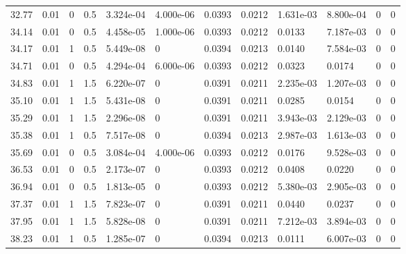 \documentclass[preview]{standalone}
\begin{document}
{{{\begin{tabular}{L{1.2cm}C{1.2cm} C{0.3cm}C{0.5cm} C{1.4cm}C{1.4cm} C{1.4cm}C{1.4cm} C{1.6cm}C{1.6cm} C{1.6cm}C{1.6cm}}
  32.77  &  0.01  & 0     & 0.5 &  3.324e-04  & 4.000e-06  &  0.0393&   0.0212& 1.631e-03 & 8.800e-04   &  0 & 0  \\ 
  34.14  &  0.01  & 0     & 0.5 &  4.458e-05  & 1.000e-06  &  0.0393&   0.0212& 0.0133 & 7.187e-03   &  0 & 0  \\ 
  34.17  &  0.01  & 1     & 0.5 &  5.449e-08  & 0  &  0.0394&   0.0213& 0.0140 & 7.584e-03   &  0 & 0  \\ 
  34.71  &  0.01  & 0     & 0.5 &  4.294e-04  & 6.000e-06  &  0.0393&   0.0212& 0.0323 & 0.0174   &  0 & 0  \\ 
  34.83  &  0.01  & 1     & 1.5 &  6.220e-07  & 0  &  0.0391&   0.0211& 2.235e-03 & 1.207e-03   &  0 & 0  \\ 
  35.10  &  0.01  & 1     & 1.5 &  5.431e-08  & 0  &  0.0391&   0.0211& 0.0285 & 0.0154   &  0 & 0  \\ 
  35.29  &  0.01  & 1     & 1.5 &  2.296e-08  & 0  &  0.0391&   0.0211& 3.943e-03 & 2.129e-03   &  0 & 0  \\ 
  35.38  &  0.01  & 1     & 0.5 &  7.517e-08  & 0  &  0.0394&   0.0213& 2.987e-03 & 1.613e-03   &  0 & 0  \\ 
  35.69  &  0.01  & 0     & 0.5 &  3.084e-04  & 4.000e-06  &  0.0393&   0.0212& 0.0176 & 9.528e-03   &  0 & 0  \\ 
  36.53  &  0.01  & 0     & 0.5 &  2.173e-07  & 0  &  0.0393&   0.0212& 0.0408 & 0.0220   &  0 & 0  \\ 
  36.94  &  0.01  & 0     & 0.5 &  1.813e-05  & 0  &  0.0393&   0.0212& 5.380e-03 & 2.905e-03   &  0 & 0  \\ 
  37.37  &  0.01  & 1     & 1.5 &  7.823e-07  & 0  &  0.0391&   0.0211& 0.0440 & 0.0237   &  0 & 0  \\ 
  37.95  &  0.01  & 1     & 1.5 &  5.828e-08  & 0  &  0.0391&   0.0211& 7.212e-03 & 3.894e-03   &  0 & 0  \\ 
  38.23  &  0.01  & 1     & 0.5 &  1.285e-07  & 0  &  0.0394&   0.0213& 0.0111 & 6.007e-03   &  0 & 0  \\ 
\hline 
\end{tabular} 

}}}
\end{document}
